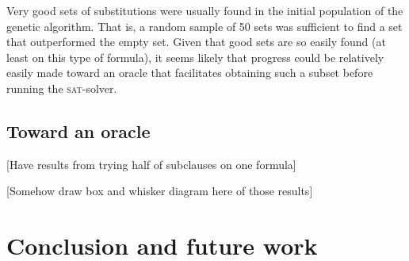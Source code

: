 \documentclass[proof,pdftex,11pt,a4,titlepage]{article}
\newcommand{\sat}{\textsc{sat}}
\begin{document}
Very good sets of substitutions were usually found in the initial population of the genetic algorithm. That is, a random sample of 50 sets was sufficient to find a set that outperformed the empty set. Given that good sets are so easily found (at least on this type of formula), it seems likely that progress could be relatively easily made toward an oracle that facilitates obtaining such a subset before running the \sat{}-solver.

\subsection{Toward an oracle}

[Have results from trying half of subclauses on one formula]

[Somehow draw box and whisker diagram here of those results]

\section{Conclusion and future work}

\FloatBarrier
\newpage




\newpage

\end{document}
